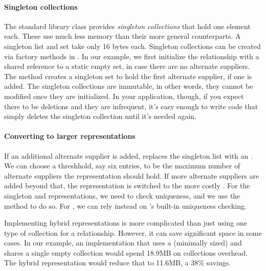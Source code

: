 \paragraph{Singleton collections}
The standard library class  provides
\emph{singleton collections} that hold one element each.
These use much
less memory than their more general counterparts.
A singleton list and set take only 16 bytes each. Singleton collections
can be created via factory methods in . In our
example, we first initialize the relationship with a shared
reference to a static empty set, in case there are no alternate suppliers. The method
 creates a singleton set to hold the first alternate supplier, if one is added. 
The singleton collections are immutable, in other words, they cannot be modified once they are
initialized. In your application, though, if you expect there to be
deletions and they are infrequent, it's easy enough to write code that simply
deletes the singleton collection until it's needed again.

\paragraph{Converting to larger representations}
If an additional alternate supplier is added, 
replaces the singleton list with an . We can choose a
threshhold, say six entries, to be the maximum number of alternate
suppliers the  representation should hold.  If more
alternate suppliers are added beyond that, the representation is switched
to the more costly .
For the singleton and  representations, we need to check
uniqueness, and we use the  method to do so. For ,
we can rely instead on
's built-in uniqueness checking. 


Implementing hybrid representations is more complicated than just using one
type of collection for a relationship. However, it can save significant space in some
cases. In our example, an implementation that uses a
 (minimally sized) and shares a single empty collection would
spend 18.9MB on collections overhead. The hybrid representation would reduce
that to 11.6MB, a 38\% savings. 

